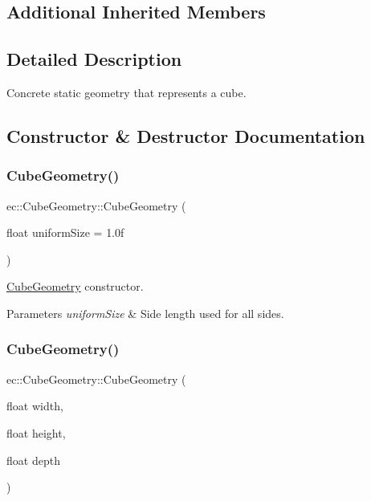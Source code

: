 \subsection*{Additional Inherited Members}


\subsection{Detailed Description}
Concrete static geometry that represents a cube. 

\subsection{Constructor \& Destructor Documentation}
\mbox{\label{classec_1_1_cube_geometry_a539617a3a7e98e1a09af01e2328bac30}} 
\subsubsection{\texorpdfstring{Cube\+Geometry()}{CubeGeometry()}\hspace{0.1cm}{\footnotesize\ttfamily [1/2]}}
{\footnotesize\ttfamily ec\+::\+Cube\+Geometry\+::\+Cube\+Geometry (\begin{DoxyParamCaption}\item[{float}]{uniform\+Size = {\ttfamily 1.0f} }\end{DoxyParamCaption})\hspace{0.3cm}{\ttfamily [explicit]}}



\mbox{\hyperlink{classec_1_1_cube_geometry}{Cube\+Geometry}} constructor. 


\begin{DoxyParams}{Parameters}
{\em uniform\+Size} & Side length used for all sides. \\
\hline
\end{DoxyParams}
\mbox{\label{classec_1_1_cube_geometry_ac4ffe05d266c00e8e337233c4c48d29f}} 
\subsubsection{\texorpdfstring{Cube\+Geometry()}{CubeGeometry()}\hspace{0.1cm}{\footnotesize\ttfamily [2/2]}}
{\footnotesize\ttfamily ec\+::\+Cube\+Geometry\+::\+Cube\+Geometry (\begin{DoxyParamCaption}\item[{float}]{width,  }\item[{float}]{height,  }\item[{float}]{depth }\end{DoxyParamCaption})\hspace{0.3cm}{\ttfamily [explicit]}}




